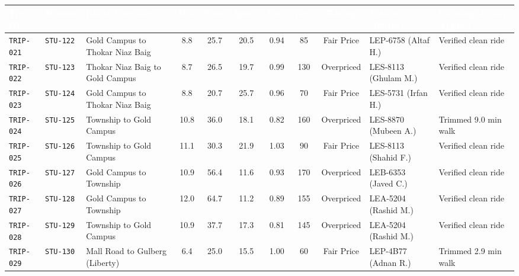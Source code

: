 \documentclass[10pt, a4paper]{article}
\begin{document}
\begin{table}[h!]
\centering
\fontsize{6.8pt}{8.6pt}\selectfont
\begin{tabularx}{\textwidth}{|l|l|l|c|c|c|c|c|c|p{2.4cm}|X|}
\hline
\rowcolor{navyblue}\textcolor{white}{\textbf{Trip ID}} & \textcolor{white}{\textbf{Student}} & \textcolor{white}{\textbf{Route Corridor}} & \textcolor{white}{\textbf{Dist}} & \textcolor{white}{\textbf{Time}} & \textcolor{white}{\textbf{Speed}} & \textcolor{white}{\textbf{Pace}} & \textcolor{white}{\textbf{Fare}} & \textcolor{white}{\textbf{Rating}} & \textcolor{white}{\textbf{Vehicle (Driver)}} & \textcolor{white}{\textbf{Cleaning Action Applied}} \\ \hline
\rowcolor{white}\texttt{TRIP-021} & \texttt{STU-122} & Gold Campus to Thokar Niaz Baig & 8.8 & 25.7 & 20.5 & 0.94 & 85 & Fair Price & LEP-6758 (Altaf H.) & Verified clean ride \\ \hline
\rowcolor{lightgray}\texttt{TRIP-022} & \texttt{STU-123} & Thokar Niaz Baig to Gold Campus & 8.7 & 26.5 & 19.7 & 0.99 & 130 & Overpriced & LES-8113 (Ghulam M.) & Verified clean ride \\ \hline
\rowcolor{white}\texttt{TRIP-023} & \texttt{STU-124} & Gold Campus to Thokar Niaz Baig & 8.8 & 20.7 & 25.7 & 0.96 & 70 & Fair Price & LES-5731 (Irfan H.) & Verified clean ride \\ \hline
\rowcolor{lightgray}\texttt{TRIP-024} & \texttt{STU-125} & Township to Gold Campus & 10.8 & 36.0 & 18.1 & 0.82 & 160 & Overpriced & LES-8870 (Mubeen A.) & Trimmed 9.0 min walk \\ \hline
\rowcolor{white}\texttt{TRIP-025} & \texttt{STU-126} & Township to Gold Campus & 11.1 & 30.3 & 21.9 & 1.03 & 90 & Fair Price & LES-8113 (Shahid F.) & Verified clean ride \\ \hline
\rowcolor{lightgray}\texttt{TRIP-026} & \texttt{STU-127} & Gold Campus to Township & 10.9 & 56.4 & 11.6 & 0.93 & 170 & Overpriced & LEB-6353 (Javed C.) & Verified clean ride \\ \hline
\rowcolor{white}\texttt{TRIP-027} & \texttt{STU-128} & Gold Campus to Township & 12.0 & 64.7 & 11.2 & 0.89 & 155 & Overpriced & LEA-5204 (Rashid M.) & Verified clean ride \\ \hline
\rowcolor{lightgray}\texttt{TRIP-028} & \texttt{STU-129} & Township to Gold Campus & 10.9 & 37.7 & 17.3 & 0.81 & 145 & Overpriced & LEA-5204 (Rashid M.) & Verified clean ride \\ \hline
\rowcolor{white}\texttt{TRIP-029} & \texttt{STU-130} & Mall Road to Gulberg (Liberty) & 6.4 & 25.0 & 15.5 & 1.00 & 60 & Fair Price & LEP-4B77 (Adnan R.) & Trimmed 2.9 min walk \\ \hline

\end{tabularx}
\end{table}
\end{document}
